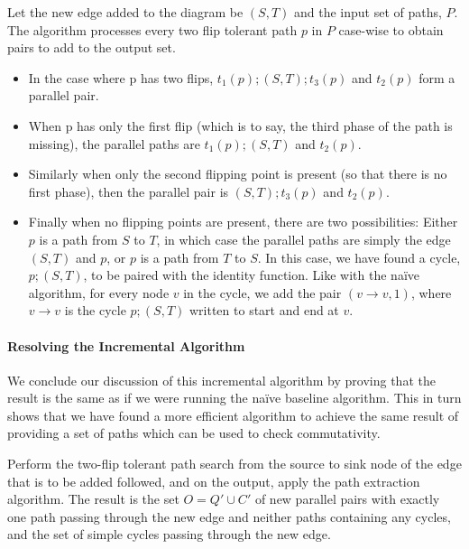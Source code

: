 \documentclass[sigplan,review,nonacm=true]{acmart}
\begin{document}
Let the new edge added to the diagram be $(S, T)$ and the input set of paths, $P$.
The algorithm processes every two flip tolerant path $p$ in $P$ case-wise to obtain pairs to add to the output set.
\begin{itemize}
\item In the case where p has two flips, $t_1(p) ; (S, T) ; t_3(p)$ and $t_2(p)$ form a parallel pair.
\item When p has only the first flip (which is to say, the third phase of the path is missing), the parallel paths are $t_1(p) ; (S, T)$ and $t_2(p)$.
\item Similarly when only the second flipping point is present (so that there is no first phase), then the parallel pair is  $(S, T) ; t_3(p)$ and $t_2(p)$.
\item Finally when no flipping points are present, there are two possibilities:
Either $p$ is a path from $S$ to $T$, in which case the parallel paths are simply the edge $(S, T)$ and $p$, or $p$ is a path from $T$ to $S$.
In this case, we have found a cycle, $p ; (S,T)$, to be paired with the identity function.
Like with the na\"{i}ve algorithm, for every node $v$ in the cycle, we add the pair $(v \rightarrow v, 1)$, where $v \rightarrow v$ is the cycle $p ; (S,T)$ written to start and end at $v$.
\end{itemize}

\paragraph{Resolving the Incremental Algorithm}
We conclude our discussion of this incremental algorithm by proving that the result is the same as if we were running the na\"{i}ve baseline algorithm.  This in turn shows that we have found a more efficient algorithm to achieve the same result of providing a set of paths which can be used to check commutativity.

\begin{theorem}
    Perform the two-flip tolerant path search from the source to sink node of the edge that is to be added followed, and on the output, apply the path extraction algorithm. 
    The result is the set $O = Q'\cup C'$ of new parallel pairs with exactly one path passing through the new edge and neither paths containing any cycles, and the set of simple cycles passing through the new edge.
\end{theorem}
\end{document}
